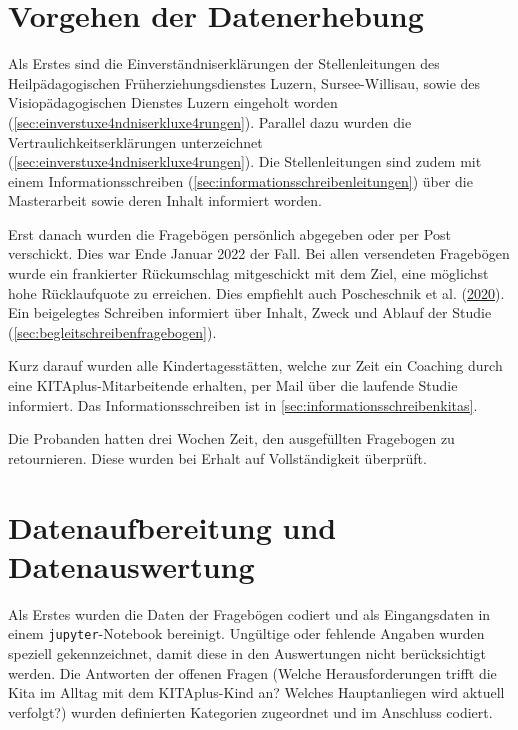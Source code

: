 \documentclass[
  ngerman,
  11pt,
  paper=a4,
  twoside,
  titlepage=true,
  openright,
  abstract=on,
  toc=listofnumbered,
  numbers=noenddot,
  chapterprefix=true,
  headings=optiontohead,
  svgnames,
  dvipsnames]{scrreprt}
\begin{document}
\hypertarget{sec:datenerhebung}{%
\section{Vorgehen der Datenerhebung}\label{sec:datenerhebung}}

Als Erstes sind die Einverständniserklärungen der Stellenleitungen des
Heilpädagogischen Früherziehungsdienstes Luzern, Sursee-Willisau, sowie
des Visiopädagogischen Dienstes Luzern eingeholt worden
(\cref{sec:einverstuxe4ndniserkluxe4rungen}). Parallel dazu wurden die
Vertraulichkeitserklärungen unterzeichnet
(\cref{sec:einverstuxe4ndniserkluxe4rungen}). Die Stellenleitungen sind
zudem mit einem Informationsschreiben
(\cref{sec:informationsschreibenleitungen}) über die Masterarbeit sowie
deren Inhalt informiert worden.

Erst danach wurden die Fragebögen persönlich abgegeben oder per Post
verschickt. Dies war Ende Januar 2022 der Fall. Bei allen versendeten
Fragebögen wurde ein frankierter Rückumschlag mitgeschickt mit dem Ziel,
eine möglichst hohe Rücklaufquote zu erreichen. Dies empfiehlt auch
Poscheschnik et al. (\protect\hyperlink{ref-hug2020}{2020}). Ein
beigelegtes Schreiben informiert über Inhalt, Zweck und Ablauf der
Studie (\cref{sec:begleitschreibenfragebogen}).

Kurz darauf wurden alle Kindertagesstätten, welche zur Zeit ein Coaching
durch eine KITAplus-Mitarbeitende erhalten, per Mail über die laufende
Studie informiert. Das Informationsschreiben ist in
\cref{sec:informationsschreibenkitas}.

Die Probanden hatten drei Wochen Zeit, den ausgefüllten Fragebogen zu
retournieren. Diese wurden bei Erhalt auf Vollständigkeit überprüft.

\hypertarget{sec:datenaufbereitung}{%
\section{Datenaufbereitung und
Datenauswertung}\label{sec:datenaufbereitung}}

Als Erstes wurden die Daten der Fragebögen codiert und als Eingangsdaten
in einem \texttt{jupyter}-Notebook bereinigt. Ungültige oder fehlende
Angaben wurden speziell gekennzeichnet, damit diese in den Auswertungen
nicht berücksichtigt werden. Die Antworten der offenen Fragen (Welche
Herausforderungen trifft die Kita im Alltag mit dem KITAplus-Kind an?
Welches Hauptanliegen wird aktuell verfolgt?) wurden definierten
Kategorien zugeordnet und im Anschluss codiert.
\end{document}
